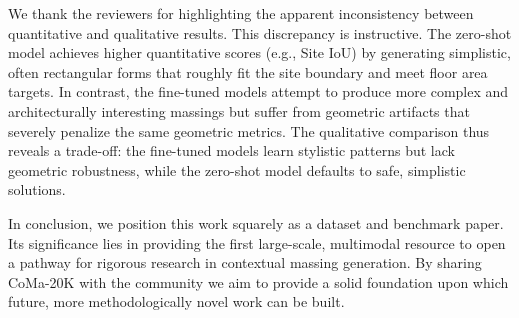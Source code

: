 \documentclass[10pt,twocolumn,letterpaper]{article}
\begin{document}
We thank the reviewers for highlighting the apparent inconsistency between quantitative and qualitative results. This discrepancy is instructive. The zero-shot model achieves higher quantitative scores (e.g., Site IoU) by generating simplistic, often rectangular forms that roughly fit the site boundary and meet floor area targets. In contrast, the fine-tuned models attempt to produce more complex and architecturally interesting massings but suffer from geometric artifacts that severely penalize the same geometric metrics. The qualitative comparison thus reveals a trade-off: the fine-tuned models learn stylistic patterns but lack geometric robustness, while the zero-shot model defaults to safe, simplistic solutions.

In conclusion, we position this work squarely as a dataset and benchmark paper. Its significance lies in providing the first large-scale, multimodal resource to open a pathway for rigorous research in contextual massing generation. By sharing CoMa-20K with the community we aim to provide a solid foundation upon which future, more methodologically novel work can be built.
\end{document}
